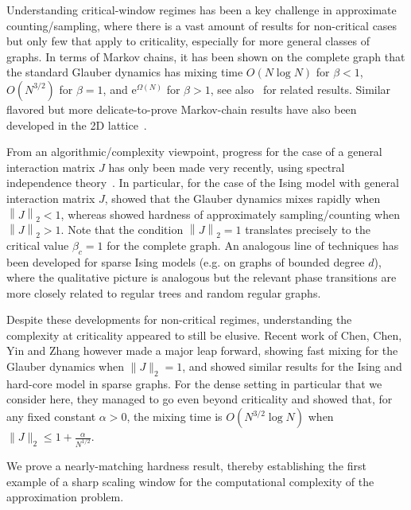 \documentclass[11pt]{article}
\newcommand{\emm}{\mathrm{e}}
\newcommand\norm[1]{\left\|{#1}\right\|}
\begin{document}
Understanding critical-window regimes has been a key challenge in  approximate counting/sampling, where  there is a vast amount of results for non-critical cases but only few that apply to criticality, especially for more general classes of graphs. In terms of Markov chains, it has been shown on the complete graph \cite{glaubera, glauberb} that the standard Glauber dynamics has mixing time $O(N\log N)$ for $\beta<1$, $O(N^{3/2})$ for $\beta=1$, and $\emm^{\Omega(N)}$ for $\beta>1$, see also~\cite{long2014power, cuff2012glauber,GSV-SwendsenWang,blanca2015dynamics,blanca2025mean,cutoffSW,helmuth2023finite} for related results. Similar flavored but more delicate-to-prove Markov-chain results have also been developed in the 2D lattice~\cite{martinelli19942,lubetzky2012critical,gheissari2018mixing}.

From an algorithmic/complexity viewpoint, progress for the case of a general interaction matrix $J$ has only been made very recently, using spectral independence theory~\cite{ALO20}.   In particular, for the case of the Ising model with general interaction matrix $J$, \cite{Ja,Jb} showed that the Glauber dynamics mixes rapidly when $\norm{J}_2<1$, whereas \cite{Inapproxa, Inapproxb} showed hardness of approximately sampling/counting  when $\norm{J}_2>1$. Note that the condition $\norm{J}_2=1$ translates precisely to the critical value $\beta_c=1$ for the complete graph. An analogous line of techniques has been developed for sparse Ising models (e.g. on graphs of bounded degree $d$), where the qualitative picture is analogous but the relevant phase transitions are more closely related to regular trees and random regular graphs. 

Despite these developments for non-critical regimes, understanding the complexity at criticality appeared to still be elusive. Recent work of Chen, Chen, Yin and Zhang \cite{CCYZ-critical-hard-core} however made a major leap forward, showing fast mixing for the Glauber dynamics when  $\|J\|_2=1$, and showed similar results for the Ising and hard-core model in sparse graphs. For the dense setting in particular that we consider here, they managed to go even beyond criticality and showed that, for any fixed constant $\alpha>0$, the mixing time is $O(N^{3/2}\log{N})$ when $\|J\|_2 \leq 1 + \frac{\alpha}{N^{1/2}}$. 

We prove a nearly-matching hardness result, thereby establishing the first example of a sharp scaling window for the computational complexity of the approximation problem.
\end{document}
